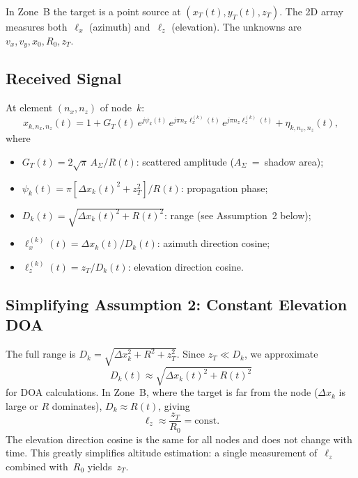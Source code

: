 \documentclass[11pt,a4paper]{article}
\begin{document}
In Zone~B the target is a point source at $(x_T(t),y_T(t),z_T)$.
The 2D array measures both~$\ell_x$ (azimuth) and~$\ell_z$
(elevation).  The unknowns are $v_x,v_y,x_0,R_0,z_T$.

\subsection{Received Signal}

At element $(n_x,n_z)$ of node~$k$:
\begin{equation}
  x_{k,n_x,n_z}(t) = 1+G_T(t)\,e^{j\psi_k(t)}\,
  e^{j\pi n_x\ell_x^{(k)}(t)}\,
  e^{j\pi n_z\ell_z^{(k)}(t)}+\eta_{k,n_x,n_z}(t),
  \label{eq:rx_signal}
\end{equation}
where
\begin{itemize}
  \item $G_T(t)=2\sqrt{\pi}\,A_\Sigma/R(t)$: scattered amplitude
    ($A_\Sigma$~=~shadow area);
  \item $\psi_k(t)=\pi[\Delta x_k(t)^2+z_T^2]/R(t)$: propagation
    phase;
  \item $D_k(t)=\sqrt{\Delta x_k(t)^2+R(t)^2}$: range (see
    Assumption~2 below);
  \item $\ell_x^{(k)}(t)=\Delta x_k(t)/D_k(t)$: azimuth direction
    cosine;
  \item $\ell_z^{(k)}(t)=z_T/D_k(t)$: elevation direction cosine.
\end{itemize}

\subsection{Simplifying Assumption 2: Constant Elevation DOA}
\label{sec:assumption2}

The full range is
$D_k=\sqrt{\Delta x_k^2+R^2+z_T^2}$.  Since $z_T\ll D_k$, we
approximate
\begin{equation}
  D_k(t)\approx\sqrt{\Delta x_k(t)^2+R(t)^2}
  \label{eq:Dk_approx}
\end{equation}
for DOA calculations.  In Zone~B, where the target is far from the
node ($\Delta x_k$ is large or $R$ dominates), $D_k\approx R(t)$,
giving
\begin{equation}
  \boxed{\ell_z\approx\frac{z_T}{R_0}=\text{const}.}
  \label{eq:lz_const}
\end{equation}
The elevation direction cosine is the same for all nodes and does
not change with time.  This greatly simplifies altitude estimation:
a single measurement of~$\ell_z$ combined with~$R_0$ yields~$z_T$.
\end{document}
